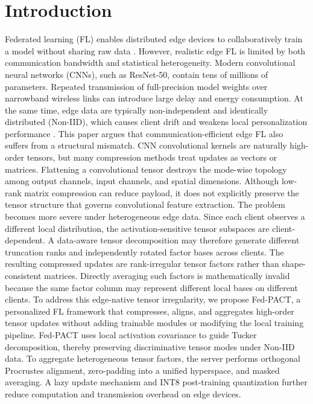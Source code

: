 \documentclass[conference]{IEEEtran}
\begin{document}
\section{Introduction}
Federated learning (FL) enables distributed edge devices to collaboratively train a model without sharing raw data \cite{mcmahan2017fedavg}. However, realistic edge FL is limited by both communication bandwidth and statistical heterogeneity. Modern convolutional neural networks (CNNs), such as ResNet-50, contain tens of millions of parameters. Repeated transmission of full-precision model weights over narrowband wireless links can introduce large delay and energy consumption. At the same time, edge data are typically non-independent and identically distributed (Non-IID), which causes client drift and weakens local personalization performance \cite{karimireddy2020scaffold}.
This paper argues that communication-efficient edge FL also suffers from a structural mismatch. CNN convolutional kernels are naturally high-order tensors, but many compression methods treat updates as vectors or matrices. Flattening a convolutional tensor destroys the mode-wise topology among output channels, input channels, and spatial dimensions. Although low-rank matrix compression can reduce payload, it does not explicitly preserve the tensor structure that governs convolutional feature extraction.
The problem becomes more severe under heterogeneous edge data. Since each client observes a different local distribution, the activation-sensitive tensor subspaces are client-dependent. A data-aware tensor decomposition may therefore generate different truncation ranks and independently rotated factor bases across clients. The resulting compressed updates are rank-irregular tensor factors rather than shape-consistent matrices. Directly averaging such factors is mathematically invalid because the same factor column may represent different local bases on different clients.
To address this edge-native tensor irregularity, we propose Fed-PACT, a personalized FL framework that compresses, aligns, and aggregates high-order tensor updates without adding trainable modules or modifying the local training pipeline. Fed-PACT uses local activation covariance to guide Tucker decomposition, thereby preserving discriminative tensor modes under Non-IID data. To aggregate heterogeneous tensor factors, the server performs orthogonal Procrustes alignment, zero-padding into a unified hyperspace, and masked averaging. A lazy update mechanism and INT8 post-training quantization further reduce computation and transmission overhead on edge devices.
\end{document}
